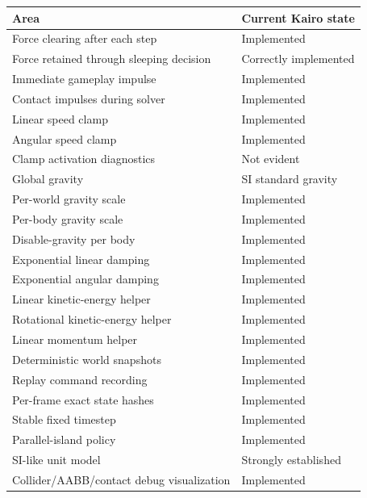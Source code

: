 {\def\LTcaptype{none} %
\begin{longtable}[]{@{}
  >{\raggedright\arraybackslash}p{}
  >{\raggedright\arraybackslash}p{}@{}}
\toprule\noalign{}
\begin{minipage}[b]{\linewidth}\raggedright
Area
\end{minipage} & \begin{minipage}[b]{\linewidth}\raggedright
Current Kairo state
\end{minipage} \\
\midrule\noalign{}
\endhead
\bottomrule\noalign{}
\endlastfoot
Force clearing after each step & Implemented \\
Force retained through sleeping decision & Correctly implemented \\
Immediate gameplay impulse & Implemented \\
Contact impulses during solver & Implemented \\
Linear speed clamp & Implemented \\
Angular speed clamp & Implemented \\
Clamp activation diagnostics & Not evident \\
Global gravity & SI standard gravity \\
Per-world gravity scale & Implemented \\
Per-body gravity scale & Implemented \\
Disable-gravity per body & Implemented \\
Exponential linear damping & Implemented \\
Exponential angular damping & Implemented \\
Linear kinetic-energy helper & Implemented \\
Rotational kinetic-energy helper & Implemented \\
Linear momentum helper & Implemented \\
Deterministic world snapshots & Implemented \\
Replay command recording & Implemented \\
Per-frame exact state hashes & Implemented \\
Stable fixed timestep & Implemented \\
Parallel-island policy & Implemented \\
SI-like unit model & Strongly established \\
Collider/AABB/contact debug visualization & Implemented \\

\end{longtable}}
